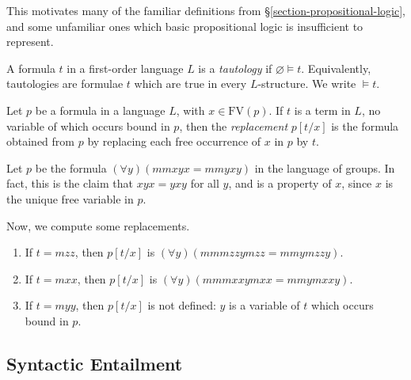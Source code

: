 \documentclass{article}
\begin{document}
This motivates many of the familiar definitions from \S\ref{section-propositional-logic}, and some unfamiliar ones which basic propositional logic is insufficient to represent.

\begin{definition}[Tautology]
    A formula $t$ in a first-order language $L$ is a \textit{tautology} if $\varnothing \vDash t$.
    Equivalently, tautologies are formulae $t$ which are true in every $L$-structure.
    We write $\vDash t$.
\end{definition}

\begin{definition}[Replacement]
    Let $p$ be a formula in a language $L$, with $x \in \mathrm{FV}(p)$. If $t$ is a term in $L$, no variable of which occurs bound in $p$, then the \textit{replacement} $p[t/x]$ is the formula obtained from $p$ by replacing each free occurrence of $x$ in $p$ by $t$.
\end{definition}

\begin{example}
	Let $p$ be the formula $(\forall y)(mmxyx=mmyxy)$ in the language of groups. In fact, this is the claim that $xyx = yxy$ for all $y$, and is a property of $x$, since $x$ is the unique free variable in $p$.
	
	Now, we compute some replacements.
	\begin{enumerate}
	    \item If $t = mzz$, then $p[t/x]$ is $(\forall y)(mmmzzymzz=mmymzzy)$.
	    \item If $t = mxx$, then $p[t/x]$ is $(\forall y)(mmmxxymxx=mmymxxy)$.
	    \item If $t = myy$, then $p[t/x]$ is not defined: $y$ is a variable of $t$ which occurs bound in $p$.
	\end{enumerate}
\end{example}


\subsection{Syntactic Entailment}
\end{document}
